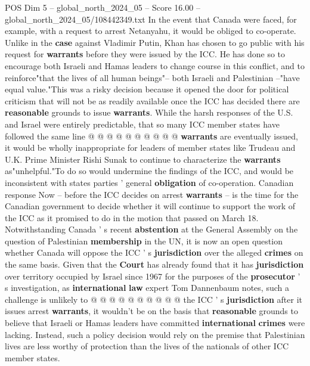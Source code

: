 \begin{textsample}{POS Dim 5 – global\_north\_2024\_05 – Score 16.00 – global\_north\_2024\_05/108442349.txt}
In the event that Canada were faced, for example, with a request to arrest Netanyahu, it would be obliged to co-operate.
Unlike in the \textbf{case} against Vladimir Putin, Khan has chosen to go public with his request for \textbf{warrants} before they were issued by the ICC.
He has done so to encourage both Israeli and Hamas leaders to change course in this conflict, and to reinforce"that the lives of all human beings"-- both Israeli and Palestinian --"have equal value."This was a risky decision because it opened the door for political criticism that will not be as readily available once the ICC has decided there are \textbf{reasonable} grounds to issue \textbf{warrants}.
While the harsh responses of the U.S. and Israel were entirely predictable, that so many ICC member states have followed the same line @ @ @ @ @ @ @ @ @ @ \textbf{warrants} are eventually issued, it would be wholly inappropriate for leaders of member states like Trudeau and U.K.
Prime Minister Rishi Sunak to continue to characterize the \textbf{warrants} as"unhelpful."To do so would undermine the findings of the ICC, and would be inconsistent with states parties ' general \textbf{obligation} of co-operation.
Canadian response Now -- before the ICC decides on arrest \textbf{warrants} -- is the time for the Canadian government to decide whether it will continue to support the work of the ICC as it promised to do in the motion that passed on March 18.
Notwithstanding Canada ' s recent \textbf{abstention} at the General Assembly on the question of Palestinian \textbf{membership} in the UN, it is now an open question whether Canada will oppose the ICC ' s \textbf{jurisdiction} over the alleged \textbf{crimes} on the same basis.
Given that the \textbf{Court} has already found that it has \textbf{jurisdiction} over territory occupied by Israel since 1967 for the purposes of the \textbf{prosecutor} ' s investigation, as \textbf{international} \textbf{law} expert Tom Dannenbaum notes, such a challenge is unlikely to @ @ @ @ @ @ @ @ @ @ the ICC ' s \textbf{jurisdiction} after it issues arrest \textbf{warrants}, it wouldn't be on the basis that \textbf{reasonable} grounds to believe that Israeli or Hamas leaders have committed \textbf{international} \textbf{crimes} were lacking.
Instead, such a policy decision would rely on the premise that Palestinian lives are less worthy of protection than the lives of the nationals of other ICC member states.

\end{textsample}
